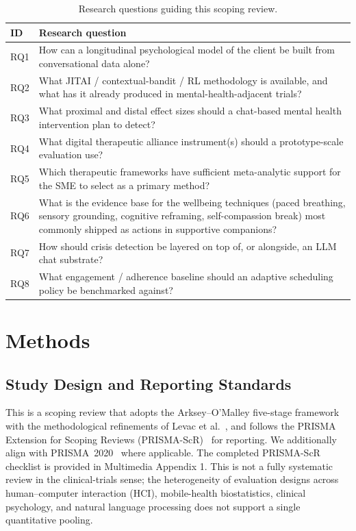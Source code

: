 \documentclass[11pt,a4paper]{article}
\begin{document}
\begin{table}[t]
\small
\begin{tabularx}{\textwidth}{l X}
\toprule
\textbf{ID} & \textbf{Research question} \\
\midrule
RQ1 & How can a longitudinal psychological model of the client be built from conversational data alone? \\
RQ2 & What JITAI / contextual-bandit / RL methodology is available, and what has it already produced in mental-health-adjacent trials? \\
RQ3 & What proximal and distal effect sizes should a chat-based mental health intervention plan to detect? \\
RQ4 & What digital therapeutic alliance instrument(s) should a prototype-scale evaluation use? \\
RQ5 & Which therapeutic frameworks have sufficient meta-analytic support for the SME to select as a primary method? \\
RQ6 & What is the evidence base for the wellbeing techniques (paced breathing, sensory grounding, cognitive reframing, self-compassion break) most commonly shipped as actions in supportive companions? \\
RQ7 & How should crisis detection be layered on top of, or alongside, an LLM chat substrate? \\
RQ8 & What engagement / adherence baseline should an adaptive scheduling policy be benchmarked against? \\
\bottomrule
\end{tabularx}
\caption{Research questions guiding this scoping review.}
\label{tab:rqs}
\end{table}

\section{Methods}\label{sec:methods}

\subsection{Study Design and Reporting Standards}\label{sec:design}

This is a scoping review that adopts the Arksey--O'Malley five-stage
framework~\cite{Arksey2005Scoping} with the methodological
refinements of Levac et al.~\cite{Levac2010Scoping}, and follows the
PRISMA Extension for Scoping Reviews (PRISMA-ScR)~\cite{Tricco2018PRISMAScR}
for reporting. We additionally align with PRISMA~2020~\cite{Page2021PRISMA}
where applicable. The completed PRISMA-ScR checklist is provided in
Multimedia Appendix 1. This is not a fully systematic review in the
clinical-trials sense; the heterogeneity of evaluation designs across
human--computer interaction (HCI), mobile-health biostatistics,
clinical psychology, and natural language processing does not support
a single quantitative pooling.
\end{document}
